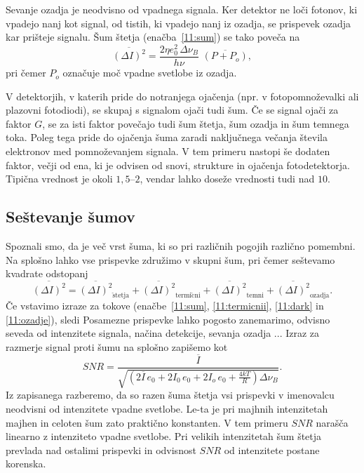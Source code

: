 Sevanje ozadja je neodvisno od vpadnega signala. Ker detektor ne loči fotonov, ki 
vpadejo nanj kot signal, od tistih, ki vpadejo nanj iz ozadja, se prispevek ozadja 
kar prišteje signalu. Šum štetja (enačba~\ref{11:sum}) se tako poveča na
\begin{equation}
\overline{(\Delta I)^2} = \frac{2 \eta e_0^2\, \Delta\nu_B}{h\nu}\,\,
\overline{\left( P + P_o \right)},
\label{11:ozadje}
\end{equation}
pri čemer $P_o$ označuje moč vpadne svetlobe iz ozadja.

\begin{remark}
 V detektorjih, v katerih pride do notranjega ojačenja
 (npr. v fotopomnoževalki
  ali plazovni fotodiodi),
 se skupaj s signalom ojači tudi šum. Če se signal ojači za faktor $G$, se za isti faktor
 povečajo tudi šum štetja, šum ozadja in šum temnega toka. Poleg tega pride do ojačenja šuma
 zaradi naključnega večanja števila elektronov med pomnoževanjem signala. V tem primeru nastopi
 še dodaten faktor, večji od ena, ki je odvisen od snovi, strukture in ojačenja fotodetektorja. 
 Tipična vrednost je okoli $1,5$--$2$, vendar lahko doseže vrednosti tudi nad $10$.
\end{remark}

\subsection*{Seštevanje šumov}
Spoznali smo, da je več vrst šuma, ki so pri različnih pogojih različno pomembni.
Na splošno lahko vse prispevke združimo v skupni šum, pri čemer seštevamo kvadrate
odstopanj
\begin{equation}
\overline{(\Delta I)^2} = \overline{(\Delta I)^2}_{\mathrm{\check{s}tetja}} + 
\overline{(\Delta I)^2}_{\mathrm{termi\check{c}ni}} + \overline{(\Delta I)^2}_{\mathrm{temni}} + 
\overline{(\Delta I)^2}_{\mathrm{ozadja}}.
\end{equation}
Če vstavimo izraze za tokove (enačbe~\ref{11:sum}, \ref{11:termicnii}, \ref{11:dark}
in \ref{11:ozadje}), sledi
Posamezne prispevke lahko pogosto zanemarimo, odvisno seveda od intenzitete signala,
načina detekcije, sevanja ozadja ... Izraz za razmerje signal proti šumu na splošno 
zapišemo kot
\begin{equation}
SNR = \frac{\overline{I}}{\sqrt{\left( 2 \overline{I}\,e_0 + 2 I_0\,e_0
+ 2 I_o\,e_0 + \frac{4 kT}{R} \right) \Delta\nu_B}}.
\end{equation}
Iz zapisanega razberemo, da so razen šuma štetja vsi prispevki v 
imenovalcu neodvisni od intenzitete vpadne svetlobe. Le-ta je pri 
majhnih intenzitetah majhen in celoten šum 
zato praktično konstanten. V tem primeru $SNR$ narašča linearno z intenziteto
vpadne svetlobe. Pri velikih intenzitetah šum štetja prevlada nad ostalimi prispevki
in odvisnost $SNR$ od intenzitete postane korenska. 

